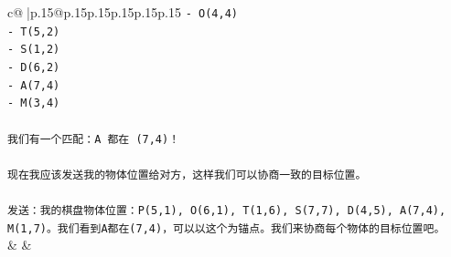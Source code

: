 \documentclass{article}
\begin{document}
{\begin{supertabular}{c@{$\;$}|p{.15\linewidth}@{}p{.15\linewidth}p{.15\linewidth}p{.15\linewidth}p{.15\linewidth}p{.15\linewidth}}
{{{\texttt{{-} O(4,4)} \\
\texttt{{-} T(5,2)} \\
\texttt{{-} S(1,2)} \\
\texttt{{-} D(6,2)} \\
\texttt{{-} A(7,4)} \\
\texttt{{-} M(3,4)} \\
\\ 
\texttt{我们有一个匹配：A 都在 (7,4)！} \\
\\ 
\texttt{现在我应该发送我的物体位置给对方，这样我们可以协商一致的目标位置。} \\
\\ 
\texttt{发送：我的棋盘物体位置：P(5,1), O(6,1), T(1,6), S(7,7), D(4,5), A(7,4), M(1,7)。我们看到A都在(7,4)，可以以这个为锚点。我们来协商每个物体的目标位置吧。} \\
            }
        }
    }
    & & \\ \\


\end{supertabular}}
\end{document}
